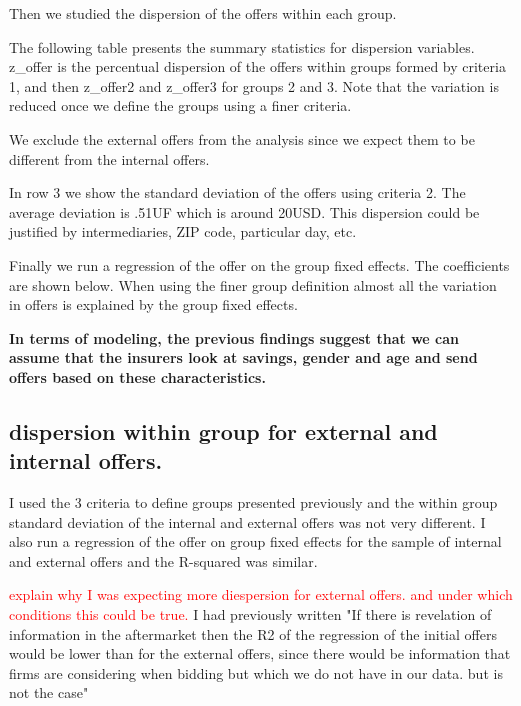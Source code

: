 \documentclass[12pt]{article}
\begin{document}
Then we studied the dispersion of the offers within each group. 

The following table presents the summary statistics for dispersion variables. 
z\_offer is the percentual dispersion of the offers within groups formed by criteria 1, and then z\_offer2 and z\_offer3 for groups 2 and 3. Note that the variation is reduced once we define the groups using a finer criteria.

We exclude the external offers from the analysis since we expect them to be different from the internal offers. 


In row 3 we show the standard deviation of the offers using criteria 2. The average deviation is .51UF which is around 20USD. This dispersion could be justified by intermediaries, ZIP code, particular day, etc. 



Finally we run a regression of the offer on the group fixed effects. The coefficients are shown below. When using the finer group definition almost all the variation in offers is explained by the group fixed effects. 

\textbf{In terms of modeling, the previous findings suggest that we can assume that the insurers look at savings, gender and age and send offers based on these characteristics. }




\subsection{dispersion within group for external and internal offers. }

I used the 3 criteria to define groups presented previously and the within group standard deviation of the internal and external offers was not very different. I also run a regression of the offer on group fixed effects for the sample of internal and external offers and the R-squared was similar. 


\textcolor{red}{explain why I was expecting more diespersion for external offers.   and under which conditions this could be true. }
I had previously written "If there is revelation of information in the aftermarket then the R2 of the regression of the initial offers would be lower than for the external offers, since there would be information that firms are considering when bidding but which we do not have in our data. but is not the case"
\end{document}

